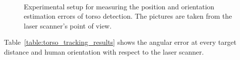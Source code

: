\begin{figure}[h]
\centering
        \\ %
    \caption{%
	Experimental setup for measuring the position and orientation estimation errors of torso detection. The pictures are taken from the laser scanner's point of view.
     }%
   \label{fig:torso_tracking_exp_setup}
\end{figure}


Table~\ref{table:torso_tracking_results} shows the angular error at every target distance and human orientation with respect to the laser scanner. 

